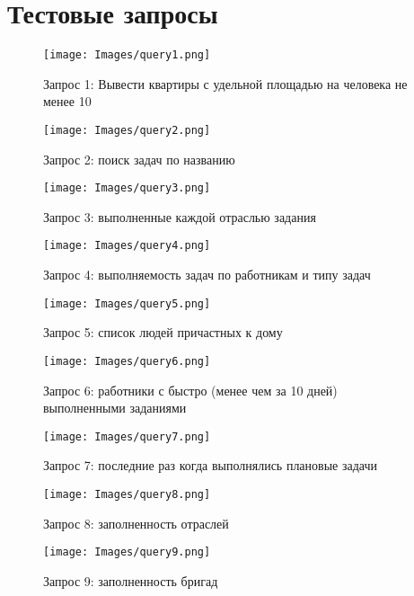 \section{Тестовые запросы}

\begin{figure}[h]
\centering
\texttt{[image: Images/query1.png]}
\caption{Запрос 1: Вывести квартиры с удельной площадью на человека не менее 10}
\end{figure}

\begin{figure}[h]
\centering
\texttt{[image: Images/query2.png]}
\caption{Запрос 2: поиск задач по названию}
\end{figure}

\begin{figure}[h]
\centering
\texttt{[image: Images/query3.png]}
\caption{Запрос 3: выполненные каждой отраслью задания}
\end{figure}

\begin{figure}[h]
\centering
\texttt{[image: Images/query4.png]}
\caption{Запрос 4: выполняемость задач по работникам и типу задач}
\end{figure}

\begin{figure}[h]
\centering
\texttt{[image: Images/query5.png]}
\caption{Запрос 5: список людей причастных к дому}
\end{figure}

\begin{figure}[h]
\centering
\texttt{[image: Images/query6.png]}
\caption{Запрос 6: работники с быстро (менее чем за 10 дней) выполненными заданиями}
\end{figure}

\begin{figure}[h]
\centering
\texttt{[image: Images/query7.png]}
\caption{Запрос 7: последние раз когда выполнялись плановые задачи}
\end{figure}

\begin{figure}[h]
\centering
\texttt{[image: Images/query8.png]}
\caption{Запрос 8: заполненность отраслей}
\end{figure}

\begin{figure}[h]
\centering
\texttt{[image: Images/query9.png]}
\caption{Запрос 9: заполненность бригад}
\end{figure}

